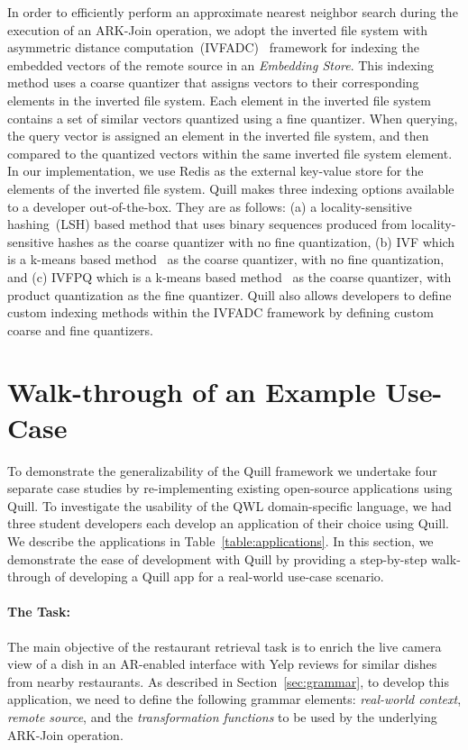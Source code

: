 \documentclass[11pt]{article}
\begin{document}
In order to efficiently perform an approximate nearest neighbor search during the execution of an ARK-Join operation, we adopt the inverted file system with asymmetric distance computation~(IVFADC)~\cite{jegou2010product} framework for indexing the embedded vectors of the remote source in an \emph{Embedding Store}. This indexing method uses a coarse quantizer that assigns vectors to their corresponding elements in the inverted file system. Each element in the inverted file system contains a set of similar vectors quantized using a fine quantizer. When querying, the query vector is assigned an element in the inverted file system, and then compared to the quantized vectors within the same inverted file system element.
In our implementation, we use Redis as the external key-value store for the elements of the inverted file system. Quill makes three indexing options available to a developer out-of-the-box. They are as follows: (a) a locality-sensitive hashing~(LSH) based method that uses binary sequences produced from locality-sensitive hashes as the coarse quantizer with no fine quantization, (b) IVF which is a k-means based method~\cite{jegou2010product} as the coarse quantizer, with no fine quantization, and (c) IVFPQ which is a k-means based method~\cite{jegou2010product} as the coarse quantizer, with product quantization as the fine quantizer. Quill also allows developers to define custom indexing methods within the IVFADC framework by defining custom coarse and fine quantizers.



\section{Walk-through of an Example Use-Case}
\label{sec:developing}

To demonstrate the generalizability of the Quill framework we undertake four separate case studies by re-implementing existing open-source applications using Quill.
To investigate the usability of the QWL domain-specific language, we had three student developers each develop an application of their choice using Quill. We describe the applications in Table~\ref{table:applications}.
In this section, we demonstrate the ease of development with Quill by providing a step-by-step walk-through of developing a Quill app for a real-world use-case scenario. 

\paragraph{The Task:} 
The main objective of the restaurant retrieval task is to enrich the live camera view of a dish in an AR-enabled interface with Yelp reviews for similar dishes from nearby restaurants. As described in Section~\ref{sec:grammar}, to develop this application, we need to define the following grammar elements: \textit{real-world context}, \textit{remote source}, and the \textit{transformation functions} to be used by the underlying ARK-Join operation.
\end{document}
